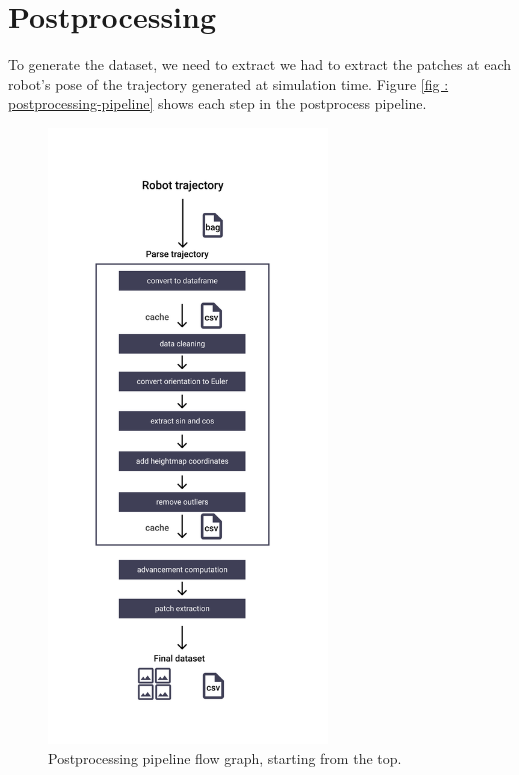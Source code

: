 \documentclass[../document.tex]{subfiles}
\begin{document}
\section{Postprocessing}
To generate the dataset, we need to extract we had to extract the patches at each robot's pose of the trajectory generated at simulation time. Figure \ref{fig : postprocessing-pipeline} shows each step in the postprocess pipeline.
\begin{figure}[htbp] 
\centering
\includegraphics[width=0.66\textwidth]{../img/postprocessing-pipeline.png}
\caption{Postprocessing pipeline flow graph, starting from the top.}
\label{fig: postprocessing-pipeline}
\end{figure}
\end{document}
